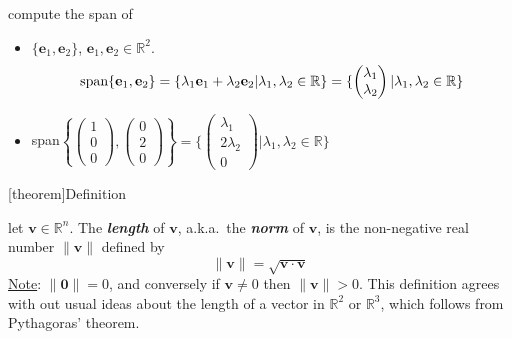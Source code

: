 \documentclass[12pt]{report}
\theoremstyle{definition}
\begin{document}
\begin{ex}
    compute the span of 
    \begin{itemize}
        \item $\{\mathbf{e}_1, \mathbf{e}_2\}$, $\mathbf{e}_1, \mathbf{e}_2 \in \mathbb{R}^2$.
            \[
                \textnormal{span}\{\mathbf{e}_1, \mathbf{e}_2\} 
                = \{\lambda_1 \mathbf{e}_1 + \lambda_2 \mathbf{e}_2 | \lambda_1, \lambda_2 \in \mathbb{R}\}
            = \{
                    \begin{pmatrix}
                            \lambda_1\\
                            \lambda_2
                    \end{pmatrix}
| \lambda_1, \lambda_2 \in\mathbb{R}\}\]

\item span$\left\{\begin{pmatrix}
        1\\
        0\\
        0
\end{pmatrix}
, \begin{pmatrix}
        0\\
        2\\
        0
\end{pmatrix}
\right\} = \{
\begin{pmatrix}
        \lambda_1\\
        2\lambda_2\\
        0
\end{pmatrix}
| \lambda_1, \lambda_2 \in \mathbb{R}
\}$
    \end{itemize}
    
\end{ex}

[theorem]{Definition}
\begin{length and norm}
    let $\mathbf{v} \in \mathbb{R}^{n}$. The \textbf{\emph{length}} of $\mathbf{v}$, a.k.a.\ the \textbf{\emph{norm}} 
    of $\mathbf{v}$, is the non-negative real number $\lVert\mathbf{v}\rVert$ defined by \[
        \lVert\mathbf{v}\rVert = \sqrt{\mathbf{v} \cdot \mathbf{v}}
    \]
    \underline{Note}: $\lVert\mathbf{0}\rVert = 0$, and conversely if $\mathbf{v} \neq 0$ then $\lVert\mathbf{v}\rVert > 0$.
    This definition agrees with out usual ideas about the length of a vector in $\mathbb{R}^{2}$
    or $\mathbb{R}^{3}$, which follows from Pythagoras' theorem.
\end{length and norm}
\end{document}
